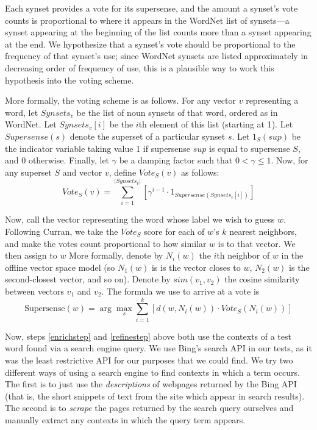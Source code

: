 \documentclass{article}
\begin{document}
\begin{enumerate}
Each synset provides a vote for its supersense, and the amount a synset's vote counts is proportional to where it appears in the WordNet list of synsets---a synset appearing at the beginning of the list counts more than a synset appearing at the end.
We hypothesize that a synset's vote should be proportional to the frequency of that synset's use; since WordNet synsets are listed approximately in decreasing order of frequency of use, this is a plausible way to work this hypothesis into the voting scheme.

More formally, the voting scheme is as follows.
For any vector $v$ representing a word, let $Synsets_v$ be the list of noun synsets of that word, ordered as in WordNet.
Let $Synsets_v[i]$ be the $i$th element of this list (starting at 1).
Let $Supersense(s)$ denote the superset of a particular synset $s$.
Let $1_{S}(sup)$ be the indicator variable taking value 1 if supersense $sup$ is equal to supersense $S$, and 0 otherwise.
Finally, let $\gamma$ be a damping factor such that $0< \gamma \leq 1$.
Now, for any superset $S$ and vector $v$, define $Vote_S(v)$ as follows:
$$Vote_S(v) = \sum_{i=1}^{|Synsets_v|}\left[ \gamma^{i-1} \cdot 1_{Supersense(Synsets_v[i])}\right]$$

Now, call the vector representing the word whose label we wish to guess $w$.
Following Curran, we take the $Vote_S$ score for each of $w$'s $k$ nearest neighbors, and make the votes count proportional to how similar $w$ is to that vector.
We then assign to $w$
More formally, denote by $N_i(w)$ the $i$th neighbor of $w$ in the offline vector space model (so $N_1(w)$ is is the vector closes to $w$, $N_2(w)$ is the second-closest vector, and so on).
Denote by $sim(v_1,v_2)$ the cosine similarity between vectors $v_1$ and $v_2$.
The formula we use to arrive at a vote is
\begin{equation}
\textrm{Supersense}(w) =
\arg\max_{s}
\sum_{i=1}^{k}
\left[
d(w, N_i(w)) \cdot
Vote_S(N_i(w))
\right]
\end{equation}

\end{enumerate}

Now, steps \ref{enrichstep} and \ref{refinestep} above both use the contexts of a test word found via a search engine query.
We use Bing's search API in our tests, as it was the least restrictive API for our purposes that we could find.
We try two different ways of using a search engine to find contexts in which a term occurs.
The first is to just use the {\it descriptions} of webpages returned by the Bing API (that is, the short snippets of text from the site which appear in search results).
The second is to {\it scrape} the pages returned by the search query ourselves and manually extract any contexts in which the query term appears.
\end{document}

